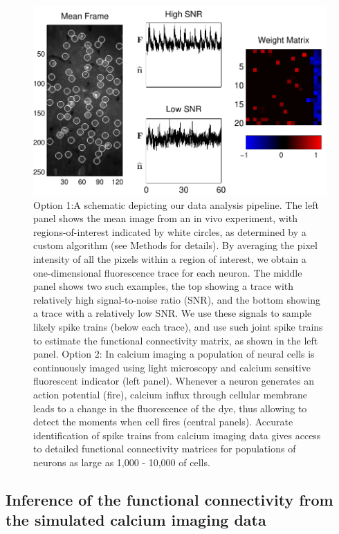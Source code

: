 \begin{figure}[h]
\centering
\includegraphics[width=\hsize]{../figs/data_example.pdf}
\caption{Option 1:A schematic depicting our data analysis pipeline.  The left panel shows the mean image from an in vivo experiment, with regions-of-interest indicated by white circles, as determined by a custom algorithm (see Methods for details).  By averaging the pixel intensity of all the pixels within a region of interest, we obtain a one-dimensional fluorescence trace for each neuron.  The middle panel shows two such examples, the top showing a trace with relatively high signal-to-noise ratio (SNR), and the bottom showing a trace with a relatively low SNR.  We use these signals to sample likely spike trains (below each trace), and use such joint spike trains to estimate the functional connectivity matrix, as shown in the left panel. Option 2: In calcium imaging a population of neural cells is continuously
imaged using light microscopy and calcium sensitive fluorescent indicator
(left panel).
Whenever a neuron generates an action potential (fire), calcium influx through
cellular membrane leads to a change in the fluorescence of the dye, thus
allowing to detect the moments when cell fires (central panels).
Accurate identification of spike trains from calcium imaging data gives
access to detailed functional connectivity matrices for populations
of neurons as large as 1,000 - 10,000 of cells.}
\label{fig:egfluor}
\end{figure}


\subsection{Inference of the functional connectivity from the simulated calcium imaging data} \label{sec:results:inference}

